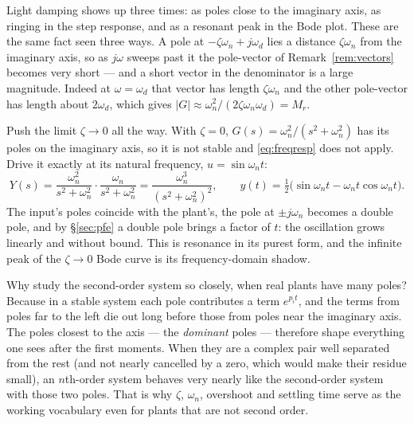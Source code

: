\documentclass[11pt]{article}
\begin{document}
\begin{remark}
Light damping shows up three times: as poles close to the imaginary axis, as
ringing in the step response, and as a resonant peak in the Bode plot. These are
the same fact seen three ways. A pole at $-\zeta\omega_n+j\omega_d$ lies a distance
$\zeta\omega_n$ from the imaginary axis, so as $j\omega$ sweeps past it the
pole-vector of Remark~\ref{rem:vectors} becomes very short --- and a short vector
in the denominator is a large magnitude. Indeed at $\omega=\omega_d$ that vector
has length $\zeta\omega_n$ and the other pole-vector has length about $2\omega_d$,
which gives $|G|\approx\omega_n^{2}/(2\zeta\omega_n\omega_d)=M_r$.
\end{remark}

\begin{example}
Push the limit $\zeta\to0$ all the way. With $\zeta=0$, $G(s)=\omega_n^{2}/(s^{2}+\omega_n^{2})$
has its poles on the imaginary axis, so it is not stable and \eqref{eq:freqresp}
does not apply. Drive it exactly at its natural frequency, $u=\sin\omega_n t$:
\[
   Y(s) = \frac{\omega_n^{2}}{s^{2}+\omega_n^{2}}\cdot\frac{\omega_n}{s^{2}+\omega_n^{2}}
        = \frac{\omega_n^{3}}{(s^{2}+\omega_n^{2})^{2}},
   \qquad
   y(t) = \tfrac12\bigl(\sin\omega_n t-\omega_n t\cos\omega_n t\bigr).
\]
The input's poles coincide with the plant's, the pole at $\pm j\omega_n$ becomes a
double pole, and by \S\ref{sec:pfe} a double pole brings a factor of $t$: the
oscillation grows linearly and without bound. This is resonance in its purest
form, and the infinite peak of the $\zeta\to0$ Bode curve is its frequency-domain
shadow.
\end{example}

\begin{remark}\label{rem:dominant}
Why study the second-order system so closely, when real plants have many poles?
Because in a stable system each pole contributes a term $e^{p_it}$, and the terms
from poles far to the left die out long before those from poles near the imaginary
axis. The poles closest to the axis --- the \emph{dominant} poles --- therefore
shape everything one sees after the first moments. When they are a complex pair
well separated from the rest (and not nearly cancelled by a zero, which would make
their residue small), an $n$th-order system behaves very nearly like the
second-order system with those two poles. That is why $\zeta$, $\omega_n$, overshoot
and settling time serve as the working vocabulary even for plants that are not
second order.
\end{remark}
\end{document}
